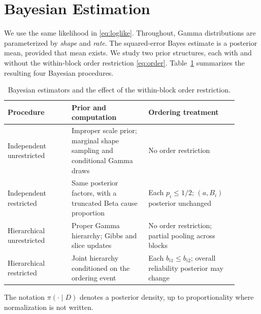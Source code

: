 \documentclass[a4paper,11pt]{article}
\begin{document}
\section{Bayesian Estimation}\label{sec:bayesian}
We use the same likelihood in \eqref{eq:loglike}. Throughout, Gamma distributions are parameterized by \emph{shape} and \emph{rate}. The squared-error Bayes estimate is a posterior mean, provided that mean exists. We study two prior structures, each with and without the within-block order restriction \eqref{eq:order}. Table~\ref{tab:bayesian-overview} summarizes the resulting four Bayesian procedures.
\begin{table}[htbp]
\centering\small
\caption{Bayesian estimators and the effect of the within-block order restriction.}\label{tab:bayesian-overview}
\begin{tabular}{p{0.25\linewidth}p{0.30\linewidth}p{0.35\linewidth}}\toprule
Procedure & Prior and computation & Ordering treatment \\\midrule
Independent unrestricted & Improper scale prior; marginal shape sampling and conditional Gamma draws & No order restriction \\
Independent restricted & Same posterior factors, with a truncated Beta cause proportion & Each $p_i\le 1/2$; $(a,B_i)$ posterior unchanged \\
Hierarchical unrestricted & Proper Gamma hierarchy; Gibbs and slice updates & No order restriction; partial pooling across blocks \\
Hierarchical restricted & Joint hierarchy conditioned on the ordering event & Each $b_{i1}\le b_{i2}$; overall reliability posterior may change \\\bottomrule
\end{tabular}
\end{table}
The notation $\pi(\cdot\mid D)$ denotes a posterior density, up to proportionality where normalization is not written.
\end{document}
